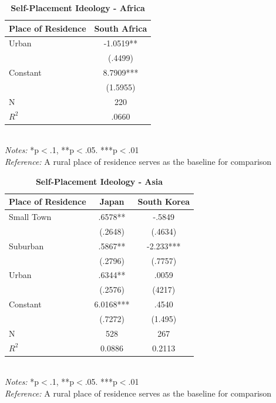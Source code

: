 \documentclass[12pt, titlepage]{article}
\newcommand\e{\emph}
\newcommand\tb{\textbf}
\begin{document}
\begin{singlespace}
	\begin{table}[H]
		\centering
		\caption{\tb{Self-Placement Ideology - Africa}}
		\begin{tabulary}{\linewidth}{l c}
			\\
			\hline
			\tb{Place of Residence}& \tb{South Africa} \\
			\hline
			Urban&-1.0519** \\
			&(.4499)\\
			Constant&8.7909*** \\
			& (1.5955) \\
			N& 220\\
			$R^2$&.0660 \\
			\hline
		\end{tabulary}
		\\
		\e{Notes:} *p$<$.1, **p$<$.05. ***p$<$.01 \\
		\e{Reference:} A rural place of residence serves as the baseline for comparison
		\label{table11}
	\end{table}
\end{singlespace}

\begin{singlespace}
	\begin{table}[H]
		\centering 
		\caption{\tb{Self-Placement Ideology - Asia}}
		\begin{tabulary}{\linewidth}{l c c}
			\\
			\hline
			\tb{Place of Residence} & \tb{Japan} & \tb{South Korea}\\
			\hline
			Small Town &.6578** & -.5849 \\
			&(.2648) & (.4634)\\
			Suburban&.5867** & -2.233*** \\
			& (.2796) & (.7757)\\
			Urban & .6344** &.0059 \\
			& (.2576) & (4217)\\
			Constant& 6.0168*** & .4540 \\
			& (.7272) & (1.495)\\
			N&528 & 267\\
			$R^2$&0.0886 & 0.2113\\
			\hline
		\end{tabulary}
		\\
		\e{Notes:} *p$<$.1, **p$<$.05. ***p$<$.01 \\
		\e{Reference:} A rural place of residence serves as the baseline for comparison
		\label{table12}
	\end{table}
\end{singlespace}
\end{document}
